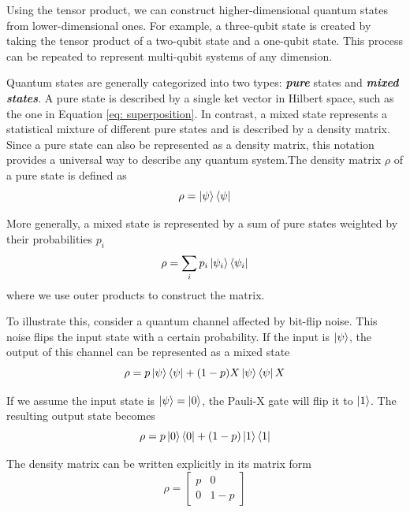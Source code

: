 \documentclass[11pt, letterpaper]{article}
\begin{document}
Using the tensor product, we can construct higher-dimensional quantum states from lower-dimensional ones. For example, a three-qubit state is created by taking the tensor product of a two-qubit state and a one-qubit state. This process can be repeated to represent multi-qubit systems of any dimension.

Quantum states are generally categorized into two types: \textbf{\textit{pure}} states and \textbf{\textit{mixed states}}. A pure state is described by a single ket vector in Hilbert space, such as the one in Equation \ref{eq: superposition}. In contrast, a mixed state represents a statistical mixture of different pure states and is described by a density matrix. Since a pure state can also be represented as a density matrix, this notation provides a universal way to describe any quantum system.The density matrix $\rho$ of a pure state is defined as
\begin{equation}
  \rho = \ket{\psi}\bra{\psi}
\end{equation}

More generally, a mixed state is represented by a sum of pure states weighted by their probabilities $p_i$
\begin{equation}
  \rho = \sum_i p_i \ket{\psi_i}\bra{\psi_i}
\end{equation}
where we use outer products to construct the matrix. 

To illustrate this, consider a quantum channel affected by bit-flip noise. This noise flips the input state with a certain probability. If the input is $\ket{\psi}$, the output of this channel can be represented as a mixed state
\begin{equation}
  \rho = p \ket{\psi}\bra{\psi} + (1-p) X \ket{\psi}\bra{\psi} X
\end{equation}

If we assume the input state is $\ket{\psi} = \ket{0}$, the Pauli-X gate will flip it to $\ket{1}$. The resulting output state becomes
\begin{equation}
  \rho = p \ket{0}\bra{0} + (1-p) \ket{1}\bra{1}
\end{equation}

The density matrix can be written explicitly in its matrix form
\begin{equation}
  \rho = \begin{bmatrix}p & 0 \\ 0 & 1-p\end{bmatrix}
  \label{eq: density_matrix}
\end{equation}
\end{document}
